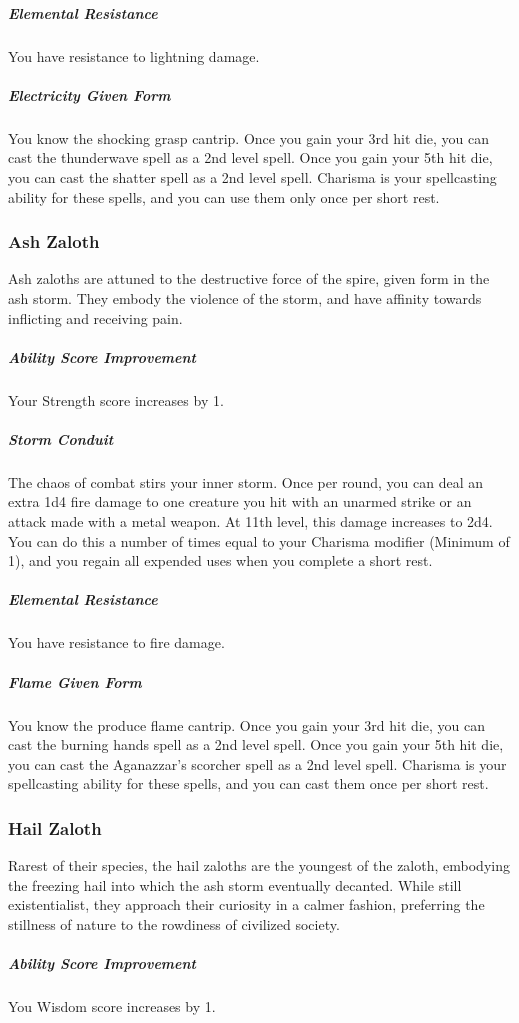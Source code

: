 \subparagraph{Elemental Resistance} You have resistance to lightning damage.

\subparagraph{Electricity Given Form} You know the shocking grasp cantrip.
Once you gain your 3rd hit die, you can cast the thunderwave spell as a 2nd level spell.
Once you gain your 5th hit die, you can cast the shatter spell as a 2nd level spell.
Charisma is your spellcasting ability for these spells, and you can use them only once per short rest.

\subsubsection{Ash Zaloth}
Ash zaloths are attuned to the destructive force of the spire, given form in the ash storm.
They embody the violence of the storm, and have affinity towards inflicting and receiving pain.

\subparagraph{Ability Score Improvement} Your Strength score increases by 1.

\subparagraph{Storm Conduit} The chaos of combat stirs your inner storm.
Once per round, you can deal an extra 1d4 fire damage to one creature you hit with an unarmed strike or an attack made with a metal weapon.
At 11th level, this damage increases to 2d4.
You can do this a number of times equal to your Charisma modifier (Minimum of 1), and you regain all expended uses when you complete a short rest.

\subparagraph{Elemental Resistance} You have resistance to fire damage.

\subparagraph{Flame Given Form} You know the produce flame cantrip.
Once you gain your 3rd hit die, you can cast the burning hands spell as a 2nd level spell.
Once you gain your 5th hit die, you can cast the Aganazzar's scorcher spell as a 2nd level spell.
Charisma is your spellcasting ability for these spells, and you can cast them once per short rest.

\subsubsection{Hail Zaloth}
Rarest of their species, the hail zaloths are the youngest of the zaloth, embodying the freezing hail into which the ash storm eventually decanted.
While still existentialist, they approach their curiosity in a calmer fashion, preferring the stillness of nature to the rowdiness of civilized society.

\subparagraph{Ability Score Improvement} You Wisdom score increases by 1.

